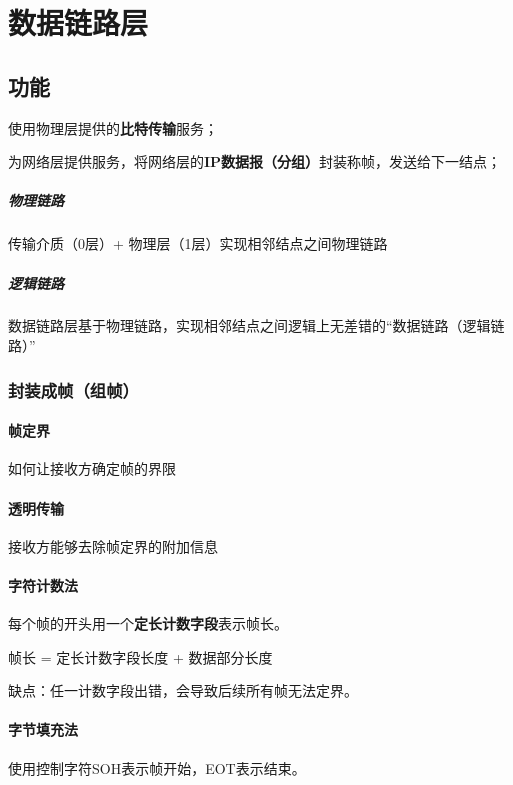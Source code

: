 
\chapter{数据链路层}

\section{功能}

使用物理层提供的\textbf{比特传输}服务；

为网络层提供服务，将网络层的\textbf{IP数据报（分组）}封装称帧，发送给下一结点；


\paragraph{物理链路}
传输介质（0层）+ 物理层（1层）实现相邻结点之间物理链路

\paragraph{逻辑链路}
数据链路层基于物理链路，实现相邻结点之间逻辑上无差错的“数据链路（逻辑链路）”


\subsection{封装成帧（组帧）}

\subsubsection{帧定界}
如何让接收方确定帧的界限


\subsubsection{透明传输}
接收方能够去除帧定界的附加信息


\subsubsection{字符计数法}
每个帧的开头用一个\textbf{定长计数字段}表示帧长。

帧长 = 定长计数字段长度 + 数据部分长度

缺点：任一计数字段出错，会导致后续所有帧无法定界。


\subsubsection{字节填充法}
使用控制字符SOH表示帧开始，EOT表示结束。

